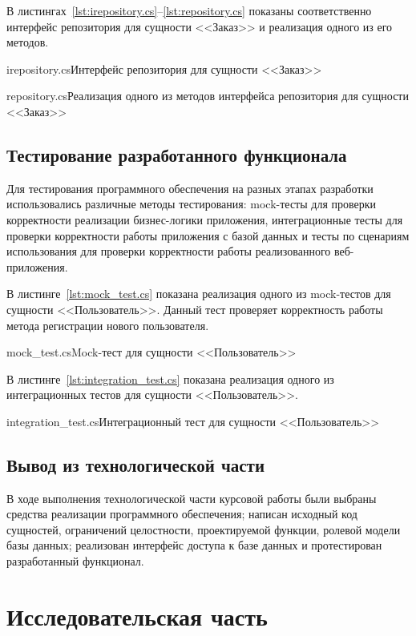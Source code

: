 \documentclass{bmstu}
\begin{document}
В листингах~\ref{lst:irepository.cs}--\ref{lst:repository.cs} показаны соответственно интерфейс репозитория для сущности <<Заказ>> и реализация одного из его методов.

{irepository.cs}{Интерфейс репозитория для сущности <<Заказ>>}

{repository.cs}{Реализация одного из методов интерфейса репозитория для сущности <<Заказ>>}

\section{Тестирование разработанного функционала}

Для тестирования программного обеспечения на разных этапах разработки использовались различные методы тестирования: mock-тесты для проверки корректности реализации бизнес-логики приложения, интеграционные тесты для проверки корректности работы приложения с базой данных и тесты по сценариям использования для проверки корректности работы реализованного веб-приложения. 

В листинге~\ref{lst:mock_test.cs} показана реализация одного из mock-тестов для сущности <<Пользователь>>. 
Данный тест проверяет корректность работы метода регистрации нового пользователя.

{mock_test.cs}{Mock-тест для сущности <<Пользователь>>}

\pagebreak
В листинге~\ref{lst:integration_test.cs} показана реализация одного из интеграционных тестов для сущности <<Пользователь>>.

{integration_test.cs}{Интеграционный тест для сущности <<Пользователь>>}

\section*{Вывод из технологической части}

В ходе выполнения технологической части курсовой работы были выбраны средства реализации программного обеспечения; написан исходный код сущностей, ограничений целостности, проектируемой функции, ролевой модели базы данных; реализован интерфейс доступа к базе данных и протестирован разработанный функционал.

\chapter{Исследовательская часть}
\end{document}
